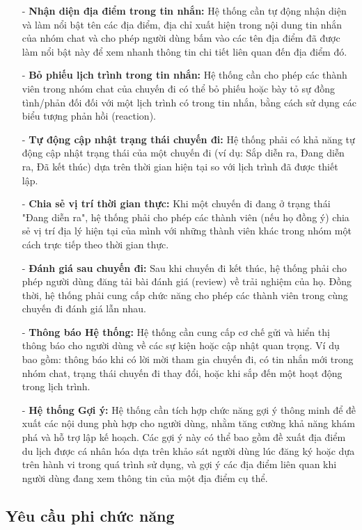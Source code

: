 \begin{itemize}
    \item[-] \textbf{Nhận diện địa điểm trong tin nhắn:} Hệ thống cần tự động nhận diện và làm nổi bật tên các địa điểm, địa chỉ xuất hiện trong nội dung tin nhắn của nhóm chat và cho phép người dùng bấm vào các tên địa điểm đã được làm nổi bật này để xem nhanh thông tin chi tiết liên quan đến địa điểm đó.
    \item[-] \textbf{Bỏ phiếu lịch trình trong tin nhắn:} Hệ thống cần cho phép các thành viên trong nhóm chat của chuyến đi có thể bỏ phiếu hoặc bày tỏ sự đồng tình/phản đối đối với một lịch trình có trong tin nhắn, bằng cách sử dụng các biểu tượng phản hồi (reaction).
    \item[-] \textbf{Tự động cập nhật trạng thái chuyến đi:} Hệ thống phải có khả năng tự động cập nhật trạng thái của một chuyến đi (ví dụ: Sắp diễn ra, Đang diễn ra, Đã kết thúc) dựa trên thời gian hiện tại so với lịch trình đã được thiết lập.
    \item[-] \textbf{Chia sẻ vị trí thời gian thực:} Khi một chuyến đi đang ở trạng thái "Đang diễn ra", hệ thống phải cho phép các thành viên (nếu họ đồng ý) chia sẻ vị trí địa lý hiện tại của mình với những thành viên khác trong nhóm một cách trực tiếp theo thời gian thực.
    \item[-] \textbf{Đánh giá sau chuyến đi:} Sau khi chuyến đi kết thúc, hệ thống phải cho phép người dùng đăng tải bài đánh giá (review) về trải nghiệm của họ. Đồng thời, hệ thống phải cung cấp chức năng cho phép các thành viên trong cùng chuyến đi đánh giá lẫn nhau.
    \item[-] \textbf{Thông báo Hệ thống:} Hệ thống cần cung cấp cơ chế gửi và hiển thị thông báo cho người dùng về các sự kiện hoặc cập nhật quan trọng. Ví dụ bao gồm: thông báo khi có lời mời tham gia chuyến đi, có tin nhắn mới trong nhóm chat, trạng thái chuyến đi thay đổi, hoặc khi sắp đến một hoạt động trong lịch trình.
    \item[-] \textbf{Hệ thống Gợi ý:} Hệ thống cần tích hợp chức năng gợi ý thông minh để đề xuất các nội dung phù hợp cho người dùng, nhằm tăng cường khả năng khám phá và hỗ trợ lập kế hoạch. Các gợi ý này có thể bao gồm đề xuất địa điểm du lịch được cá nhân hóa dựa trên khảo sát người dùng lúc đăng ký hoặc dựa trên hành vi trong quá trình sử dụng, và gợi ý các địa điểm liên quan khi người dùng đang xem thông tin của một địa điểm cụ thể.
\end{itemize}

\subsection{Yêu cầu phi chức năng}


